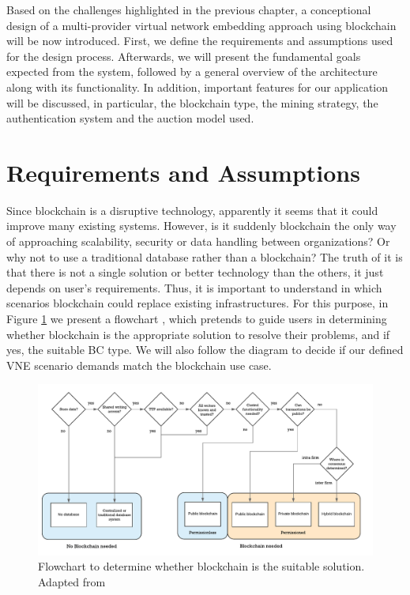 Based on the challenges highlighted in the previous chapter, a conceptional design of a multi-provider virtual network embedding approach using blockchain will be now introduced. First, we define the requirements and assumptions used for the design process. Afterwards, we will present the fundamental goals expected from the system, followed by a general overview of the architecture along with its functionality. In addition, important features for our application will be discussed, in particular, the blockchain type, the mining strategy, the authentication system and the auction model used.

\section{Requirements and Assumptions} \label{requirements}

Since blockchain is a disruptive technology, apparently it seems that it could improve many existing systems. However, is it suddenly blockchain the only way of approaching scalability, security or data handling between organizations? Or why not to use a traditional database rather than a blockchain? The truth of it is that there is not a single solution or better technology than the others, it just depends on user's requirements. Thus, it is important to understand in which scenarios blockchain could replace existing infrastructures. For this purpose, in Figure \ref{fig:bcFlowchart} we present a flowchart \citep{wust2017you}, which pretends to guide users in determining whether blockchain is the appropriate solution to resolve their problems, and if yes, the suitable BC type. We will also follow the diagram to decide if our defined VNE scenario demands match the blockchain use case.

\begin{figure}[bth]
	\centering
	\includegraphics[width=1\linewidth]{gfx/bcFlowchart}    
  	\caption{Flowchart to determine whether blockchain is the suitable solution. Adapted from \citep{wust2017you}}
  	\label{fig:bcFlowchart}
\end{figure}

